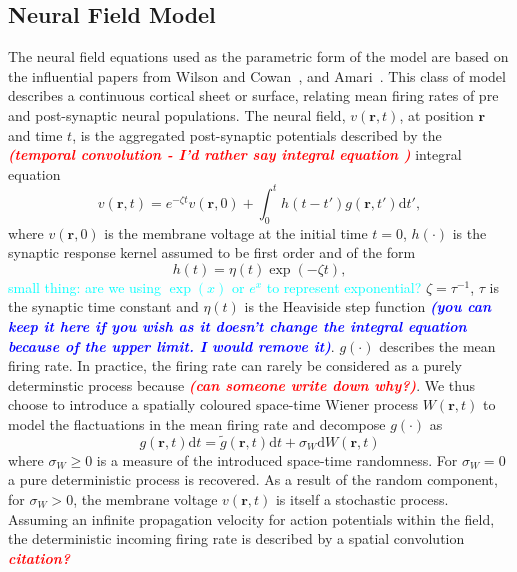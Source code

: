 \documentclass[]{article}
\newcommand{\dean}[1]{\textsf{\emph{\textbf{\textcolor{red}{#1}}}}}
\newcommand{\parham}[1]{\textsf{\emph{\textbf{\textcolor{blue}{#1}}}}}
\newcommand{\cyan}{\textcolor{cyan}}
\begin{document}
\subsection{Neural Field Model}
The neural field equations used as the parametric form of the model are based on the influential papers from Wilson and Cowan~\cite{Wilson1973}, and Amari~\cite{Amari1977}. This class of model describes a continuous cortical sheet or surface, relating mean firing rates of pre and post-synaptic neural populations. The neural field, $v\left( {\mathbf{r},t} \right)$, at position $\mathbf{r}$ and time $t$, is the aggregated post-synaptic potentials described by the \dean{(temporal convolution - I'd rather say integral equation	)} integral equation 
\begin{equation}
	\label{SpikesToPotential} v\left( {\mathbf{r},t} \right) = e^{-\zeta t}v\left( {\mathbf{r},0} \right) + \int_{0}^t {h\left( {t - t'} \right)g\left( {\mathbf{r},t'} \right)\textrm{d}t'}, 
\end{equation}   
where $v\left( {\mathbf{r},0} \right)$ is the membrane voltage at the initial time $t = 0$, $h(\cdot)$ is the synaptic response kernel assumed to be first order and of the form 
\begin{equation}
	\label{SynapticRespKernel} h(t) = \eta(t)\exp{\left(-\zeta t\right)}, 
\end{equation}
\cyan{small thing: are we using $\exp(x)$ or $e^x$ to represent exponential?}
$\zeta=\tau^{-1}$, $\tau$ is the synaptic time constant and $\eta(t)$ is the Heaviside step function \parham{(you can keep it here if you wish as it doesn't change the integral equation because of the upper limit. I would remove it)}. $g(\cdot)$ describes the mean firing rate. In practice, the firing rate can rarely be considered as a purely determinstic process because \dean{(can someone write down why?)}. We thus choose to introduce a spatially coloured space-time Wiener process $W(\mathbf{r},t)$ to model the flactuations in the mean firing rate and decompose $g(\cdot)$ as
\begin{equation}\label{DecompositionOfg}
g(\mathbf{r},t)\textrm{d}t = \tilde{g}(\mathbf{r},t)\textrm{d}t + \sigma_W \textrm{d}W(\mathbf{r},t) 
\end{equation}
where $\sigma_W \ge 0$ is a measure of the introduced space-time randomness. For $\sigma_W = 0$ a pure deterministic process is recovered. As a result of the random component, for $\sigma_W > 0$, the membrane voltage $v(\mathbf{r},t)$ is itself a stochastic process. Assuming an infinite propagation velocity for action potentials within the field, the deterministic incoming firing rate is described by a spatial convolution \dean{citation?}
\end{document}
